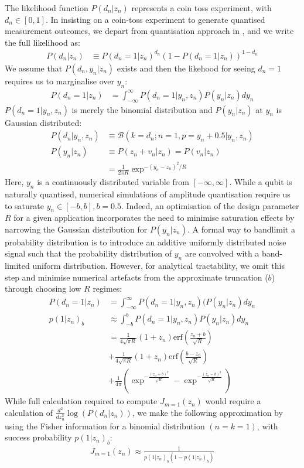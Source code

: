 The likelihood function $P(d_n|z_n)$ represents a coin toss experiment, with $d_n \in [0,1]$. In insisting on a coin-toss experiment to generate quantised measurement outcomes, we depart from quantisation approach in \cite{karlsson2005}, and we write the full likelihood as:
\begin{align}
P(d_n|z_n) & \equiv P(d_n=1|z_n)^{d_n}(1 - P(d_n=1|z_n))^{1-d_n} 
\end{align}
We assume that $P(d_n, y_n | z_n)$ exists and then the likehood for seeing $d_n=1$ requires us to marginalise over $y_n$:
\begin{align}
P(d_n=1|z_n) & = \int_{-\infty}^\infty P(d_n=1|y_n, z_n) P(y_n | z_n) dy_n 
\end{align}
$P(d_n=1|y_n, z_n)$ is merely the binomial distribution and $P(y_n | z_n)$ at $y_n$ is Gaussian distributed:
\begin{align}
P(d_n|y_n, z_n) &\equiv \mathcal{B}(k=d_n; n=1, p=y_n + 0.5| y_n, z_n) \\
P(y_n | z_n) &\equiv  P(z_n + v_n | z_n) = P(v_n | z_n) \\
 & = \frac{1}{2\pi R}\exp^{ -(y_n - z_n)^2 /R}  
\end{align}
Here, $y_n$ is a continuously distributed variable from $[-\infty, \infty]$. While a qubit is naturally quantised, numerical simulations of amplitude quantisation require us to saturate $ y_n \in[-b, b], b = 0.5$. Indeed, an optimisation of the design parameter $R$ for a given application incorporates the need to minimise saturation effects by narrowing the Gaussian distribution for $ P(y_n | z_n) $. A formal way to bandlimit a probability distribution is to introduce an additive uniformly distributed noise signal such that the probability distribution of $y_n$ are convolved with a band-limited uniform distribution. However, for analytical tractability, we omit this step and minimise numerical artefacts from the approximate truncation ($b$) through choosing low $R$ regimes:
\begin{align}
P(d_n=1|z_n) & = \int_{-\infty}^\infty P(d_n=1|y_n, z_n) (P(y_n | z_n) dy_n \\
p(1|z_n)_b & \approx \int_{-b}^{b} P(d_n=1|y_n, z_n) P(y_n | z_n) dy_n \\
&= \frac{1}{4\sqrt{\pi R}} (1 + z_n) \text{erf}(\frac{z_n + b}{\sqrt{R}})  \\
&+ \frac{1}{4\sqrt{\pi R}} (1 + z_n) \text{erf}(\frac{b - z_n }{\sqrt{R}})\\
&+ \frac{1}{4\pi} (\exp^{-\frac{(z_n + b)^2}{\sqrt{R}}} - \exp^{-\frac{(z_n - b)^2}{\sqrt{R}}})
\end{align}
While full calculation required to compute $J_{m=1} (z_n)$ would require a calculation of $ \frac{d^2}{dz_n^2} \log(P(d_n | z_n))$, we make the following approximation by using the Fisher information for a binomial distribution $(n=k=1)$, with success probability $ p(1|z_n)_b$:
\begin{align}
J_{m=1} (z_n) \approx \frac{1}{p(1|z_n)_b (1 - p(1|z_n)_b)}
\end{align}

